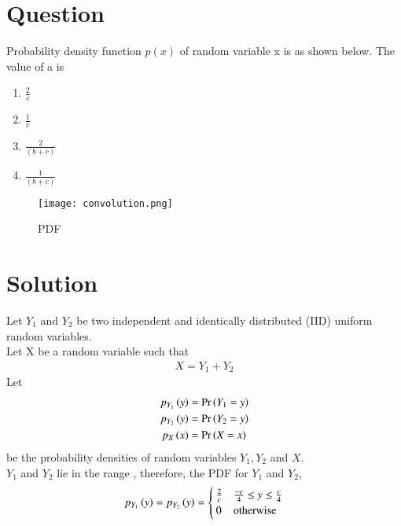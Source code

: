 \documentclass[journal,12pt,twocolumn]{IEEEtran}
\begin{document}
\section*{Question}
Probability density function $p(x)$ of random variable x is as shown below. The value of a is
\begin{enumerate}[label=\Alph*)]
    \item $\frac{2}{c}$
    \item $\frac{1}{c}$
    \item $\frac{2}{(b+c)}$
    \item $\frac{1}{(b+c)}$
\end{enumerate}
\begin{figure}[H]
\centering
\texttt{[image: convolution.png]}
\caption{PDF}
\label{fig:convolution}
\end{figure}
\section*{Solution}

Let $Y_1$ and $Y_2$ be two independent and identically distributed (IID) uniform random variables.\\
Let X be a random variable such that
\begin{align}
    X = Y_1 + Y_2
\end{align}
Let
\begin{align}
    p_{Y_1}\left(y\right) &= \Pr\left(Y_1=y\right) \\
    p_{Y_2}\left(y\right) &= \Pr\left(Y_2=y\right) \\
    p_X\left(x\right) &= \Pr\left(X=x\right)
\end{align}
be the probability densities of random variables $Y_1, Y_2$ and $X$. \\
$Y_1$ and $Y_2$ lie in the range , therefore, the PDF for $Y_1$ and $Y_2$,
\begin{align}
p_{Y_1}\left(y\right) = p_{Y_2}\left(y\right) = 
\begin{cases}
\frac{2}{c} &  \frac{-c}{4} \le y \le \frac{c}{4}\\
0 & \text{otherwise}
\end{cases}
\end{align}
\end{document}
